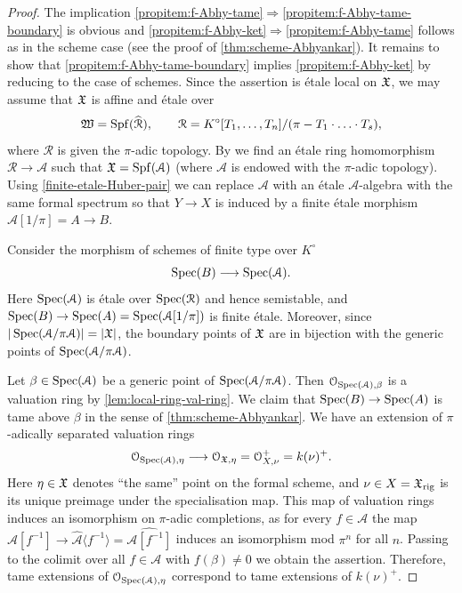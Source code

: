 \begin{proof}
The implication \ref{propitem:f-Abhy-tame}$\Rightarrow$\ref{propitem:f-Abhy-tame-boundary} is obvious and  \ref{propitem:f-Abhy-ket}$\Rightarrow$\ref{propitem:f-Abhy-tame} follows as in the scheme case (see the proof of \cref{thm:scheme-Abhyankar}). It remains to show that  \ref{propitem:f-Abhy-tame-boundary} implies \ref{propitem:f-Abhy-ket} by reducing to the case of schemes. Since the assertion is \'etale local on ${\mathfrak{X}}$, we may assume that ${\mathfrak{X}}$ is affine and \'etale over 
\[
    \mathfrak{W} = \operatorname{Spf}(\widehat{\mathcal{R}}), \qquad \mathcal{R} = K^\circ[T_1, \ldots, T_n]/(\pi - T_1\cdot\ldots\cdot T_s),
\]
where $\mathcal{R}$ is given the $\pi$-adic topology. By \cite[Corollary~1.7.3(iii)]{HuberBook} we find an \'etale ring homomorphism $\mathcal{R}\to \mathcal{A}$ such that ${\mathfrak{X}} = \operatorname{Spf}(\mathcal{A})$ (where $\mathcal{A}$ is endowed with the $\pi$-adic topology). Using \cref{finite-etale-Huber-pair} we can replace $\mathcal{A}$ with an \'etale $\mathcal{A}$-algebra with the same formal spectrum so that $Y\to X$ is induced by a finite \'etale morphism $\mathcal{A}[1/\pi]=A\to B$.

Consider the morphism of schemes of finite type over $K^\circ$
\[ 
    \operatorname{Spec}(B) \longrightarrow \operatorname{Spec}(\mathcal{A}).
\]
Here $\operatorname{Spec}(\mathcal{A})$ is \'etale over $\operatorname{Spec}(\mathcal{R})$ and hence semistable, and $\operatorname{Spec}(B)\to \operatorname{Spec}(A) = \operatorname{Spec}(\mathcal{A}[1/\pi])$ is finite \'etale. Moreover, since $|\operatorname{Spec}(\mathcal{A}/\pi \mathcal{A})| = |{\mathfrak{X}}|$, the boundary points of ${\mathfrak{X}}$ are in bijection with the generic points of $\operatorname{Spec}(\mathcal{A}/\pi \mathcal{A})$. 

Let $\beta \in \operatorname{Spec}(\mathcal{A})$ be a generic point of $\operatorname{Spec}(\mathcal{A}/\pi \mathcal{A})$. Then ${\mathcal O}_{\operatorname{Spec}(\mathcal{A}), \beta}$ is a valuation ring by \cref{lem:local-ring-val-ring}. We claim that $\operatorname{Spec}(B)\to \operatorname{Spec}(A)$ is tame above $\beta$ in the sense of \cref{thm:scheme-Abhyankar}. We have an extension of $\pi$-adically separated valuation rings 
\[ 
    {\mathcal O}_{\operatorname{Spec}(\mathcal{A}), \eta} \longrightarrow {\mathcal O}_{{\mathfrak{X}}, \eta} = {\mathcal O}_{X, \nu}^+ = k(\nu)^+.
\]
Here $\eta\in {\mathfrak{X}}$ denotes ``the same'' point on the formal scheme, and $\nu\in X = {\mathfrak{X}}_{\rm rig}$ is its unique preimage under the specialisation map. This map of valuation rings induces an isomorphism on $\pi$-adic completions, as for every $f\in \mathcal{A}$ the map $\mathcal{A}[f^{-1}]\to \widehat{\mathcal{A}}\langle f^{-1}\rangle = \widehat{\mathcal{A}[f^{-1}]}$  induces an isomorphism mod $\pi^n$ for all $n$. Passing to the colimit over all $f\in \mathcal{A}$ with $f(\beta)\neq 0$ we obtain the assertion. Therefore, tame extensions of ${\mathcal O}_{\operatorname{Spec}(\mathcal{A}), \eta}$ correspond to tame extensions of $k(\nu)^+$.  


\end{proof}
